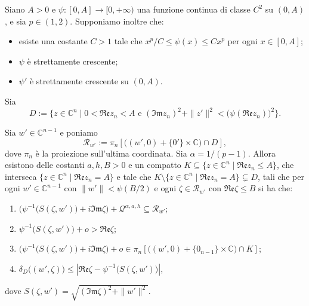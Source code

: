 \begin{lm}\label{6punto4}
    Siano $A>0$ e $\psi:[0,A]\longrightarrow[0,+\infty)$ una funzione continua di classe $C^2$ su $(0,A)$, e sia $p\in(1,2)$. Supponiamo inoltre che:
    \begin{itemize}
        \item esiste una costante $C>1$ tale che $x^p/C\le\psi(x)\le Cx^p$ per ogni $x\in[0,A]$;
        \item $\psi$ è strettamente crescente;
        \item $\psi'$ è strettamente crescente su $(0,A)$.
    \end{itemize}

    Sia
    $$D:=\{z\in\mathbb{C}^n\mid 0<\mathfrak{Re}z_n<A\text{ e }(\mathfrak{Im}z_n)^2+\|z'\|^2<\big(\psi(\mathfrak{Re}z_n)\big)^2\}.$$

    Sia $w'\in\mathbb{C}^{n-1}$ e poniamo
    $$\mathcal{R}_{w'}:=\pi_n\left[\big((w',0)+\{0'\}\times\mathbb{C}\big)\cap D\right],$$
    dove $\pi_n$ è la proiezione sull'ultima coordinata. Sia $\alpha=1/(p-1)$. Allora esistono delle costanti $a,h,B>0$ e un compatto $K\subseteq\{z\in\mathbb{C}^n\mid\mathfrak{Re}z_n\le A\}$, che interseca $\{z\in\mathbb{C}^n\mid\mathfrak{Re}z_n=A\}$ e tale che $K\setminus\{z\in\mathbb{C}^n\mid\mathfrak{Re}z_n=A\}\subsetneq D$, tali che per ogni $w'\in\mathbb{C}^{n-1}$ con $\|w'\|<\psi(B/2)$ e ogni $\zeta\in\mathcal{R}_{w'}$ con $\mathfrak{Re}\zeta\le B$ si ha che:
    \begin{enumerate}[label={(\arabic*)}]
        \item $\Big(\psi^{-1}\big(S(\zeta,w')\big)+i\mathfrak{Im}\zeta\Big)+\mathcal{Q}^{\alpha,a,h}\subseteq\mathcal{R}_{w'}$;
        \item $\psi^{-1}\big(S(\zeta,w')\big)+o>\mathfrak{Re}\zeta$;
        \item $\Big(\psi^{-1}\big(S(\zeta,w')\big)+i\mathfrak{Im}\zeta\Big)+o\in\pi_n\left[\big((w',0)+\{0_{n-1}\}\times\mathbb{C}\big)\cap K\right]$;
        \item $\delta_D\big((w',\zeta)\big) \le \left|\mathfrak{Re}\zeta-\psi^{-1}\big(S(\zeta,w')\big)\right|$,
    \end{enumerate}
    dove $S(\zeta,w')=\sqrt{(\mathfrak{Im}\zeta)^2+\|w'\|^2}$.
\end{lm}

